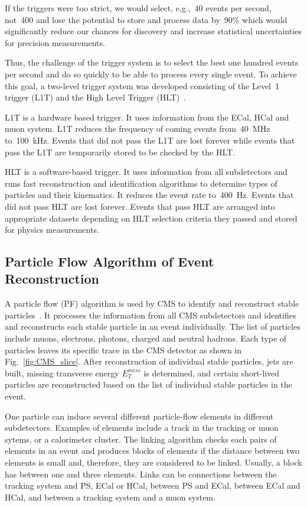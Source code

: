If the triggers were too strict, we would select, e.g.,~40 events per second, not~400 and lose the potential to store and process data by~90\% which would significantly reduce our chances for discovery and increase statistical uncertainties for precision measurements.

Thus, the challenge of the trigger system is to select the best one hundred events per second and do so quickly to be able to process every single event. To achieve this goal, a two-level trigger system was developed consisting of the Level~1 trigger (L1T) and the High Level Trigger (HLT)~\cite{ref_TriggerSystem}.

L1T is a hardware based trigger. It uses information from the ECal, HCal and muon system. L1T reduces the frequency of coming events from~40~MHz to~100~kHz. Events that did not pass the L1T are lost forever while events that pass the L1T are temporarily stored to be checked by the HLT.

HLT is a software-based trigger. It uses information from all subdetectors and runs fast reconstruction and identification algorithms to determine types of particles and their kinematics. It reduces the event rate to~400~Hz. Events that did not pass HLT are lost forever. Events that pass HLT are arranged into appropriate datasets depending on HLT selection criteria they passed and stored for physics measurements.


\subsection{Particle Flow Algorithm of Event Reconstruction}

A particle flow (PF) algorithm is used by CMS to identify and reconstruct stable particles~\cite{ref_ParticleFlowAlg}. It processes the information from all CMS subdetectors and identifies and reconstructs each stable particle in an event individually. The list of particles include muons, electrons, photons, charged and neutral hadrons. Each type of particles leaves its specific trace in the CMS detector as shown in Fig.~\ref{fig:CMS_slice}. After reconstruction of individual stable particles, jets are built, missing transverse energy $E_T^{miss}$ is determined, and certain short-lived particles are reconstructed based on the list of individual stable particles in the event.

One particle can induce several different particle-flow elements in different subdetectors. Examples of elements include a track in the tracking or muon sytems, or a calorimeter cluster. The linking algorithm checks each pairs of elements in an event and produces blocks of elements if the distance between two elements is small and, therefore, they are considered to be linked. Usually, a block has between one and three elements. Links can be connections between the tracking system and PS, ECal or HCal, between PS and ECal, between ECal and HCal, and between a tracking system and a muon system. 

